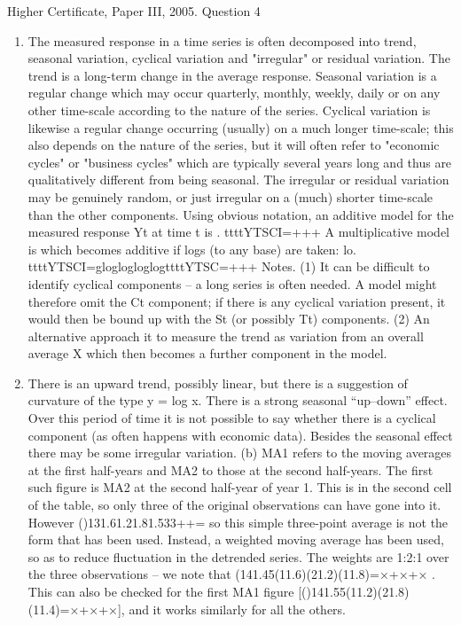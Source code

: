 \documentclass[a4paper,12pt]{article}
\begin{document}
Higher Certificate, Paper III, 2005. Question 4
\begin{enumerate}
    \item The measured response in a time series is often decomposed into trend, seasonal variation, cyclical variation and "irregular" or residual variation. The trend is a long-term change in the average response. Seasonal variation is a regular change which may occur quarterly, monthly, weekly, daily or on any other time-scale according to the nature of the series. Cyclical variation is likewise a regular change occurring (usually) on a much longer time-scale; this also depends on the nature of the series, but it will often refer to "economic cycles" or "business cycles" which are typically several years long and thus are qualitatively different from being seasonal. The irregular or residual variation may be genuinely random, or just irregular on a (much) shorter time-scale than the other components.
Using obvious notation, an additive model for the measured response Yt at time t is
. ttttYTSCI=+++
A multiplicative model is which becomes additive if logs (to any base) are taken: lo. ttttYTSCI=gloglogloglogttttYTSC=+++
Notes.
(1) It can be difficult to identify cyclical components – a long series is often needed. A model might therefore omit the Ct component; if there is any cyclical variation present, it would then be bound up with the St (or possibly Tt) components.
(2) An alternative approach it to measure the trend as variation from an overall average X which then becomes a further component in the model.
\item There is an upward trend, possibly linear, but there is a suggestion of curvature of the type y = log x. There is a strong seasonal “up–down” effect. Over this period of time it is not possible to say whether there is a cyclical component (as often happens with economic data). Besides the seasonal effect there may be some irregular variation.
(b) MA1 refers to the moving averages at the first half-years and MA2 to those at the second half-years. The first such figure is MA2 at the second half-year of year 1. This is in the second cell of the table, so only three of the original observations can have gone into it. However ()131.61.21.81.533++= so this simple three-point average is not the form that has been used. Instead, a weighted moving average has been used, so as to reduce fluctuation in the detrended series. The weights are 1:2:1 over the three observations – we note that (141.45(11.6)(21.2)(11.8)=×+×+× . This can also be checked for
the first MA1 figure [()141.55(11.2)(21.8)(11.4)=×+×+×], and it works similarly for all the others.

\end{enumerate}
\end{document}
